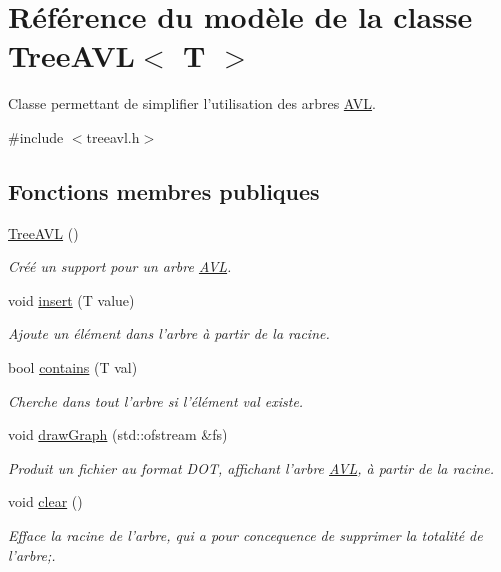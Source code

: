 \hypertarget{class_tree_a_v_l}{\section{Référence du modèle de la classe Tree\-A\-V\-L$<$ T $>$}
\label{class_tree_a_v_l}
}


Classe permettant de simplifier l'utilisation des arbres \hyperlink{class_a_v_l}{A\-V\-L}.  




{\ttfamily \#include $<$treeavl.\-h$>$}

\subsection*{Fonctions membres publiques}
\begin{DoxyCompactItemize}
\item 
\hyperlink{class_tree_a_v_l_a43c4c69a41c5dc84010d2a265def4120}{Tree\-A\-V\-L} ()
\begin{DoxyCompactList}\small\item\em Créé un support pour un arbre \hyperlink{class_a_v_l}{A\-V\-L}. \end{DoxyCompactList}\item 
void \hyperlink{class_tree_a_v_l_a4a6c318a68ff6823d5ff8a5cb662b5b1}{insert} (T value)
\begin{DoxyCompactList}\small\item\em Ajoute un élément dans l'arbre à partir de la racine. \end{DoxyCompactList}\item 
bool \hyperlink{class_tree_a_v_l_a7f5167c9fbbbb74301698fb96194d66d}{contains} (T val)
\begin{DoxyCompactList}\small\item\em Cherche dans tout l'arbre si l'élément val existe. \end{DoxyCompactList}\item 
void \hyperlink{class_tree_a_v_l_ab065c613fb398873257f3ec2aa708fd6}{draw\-Graph} (std\-::ofstream \&fs)
\begin{DoxyCompactList}\small\item\em Produit un fichier au format D\-O\-T, affichant l'arbre \hyperlink{class_a_v_l}{A\-V\-L}, à partir de la racine. \end{DoxyCompactList}\item 
void \hyperlink{class_tree_a_v_l_a0fe5b522c1b6e620e3a6092c3a96b76c}{clear} ()
\begin{DoxyCompactList}\small\item\em Efface la racine de l'arbre, qui a pour concequence de supprimer la totalité de l'arbre;. \end{DoxyCompactList}\end{DoxyCompactItemize}
